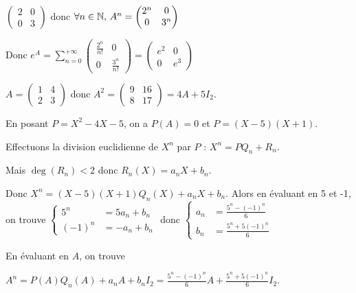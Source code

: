 \begin{exemple}
    $\begin{pmatrix}
        2 & 0 \\
        0 & 3
    \end{pmatrix}$ donc $\forall n \in \mathbb{N}, \, A^n = \begin{pmatrix}
        2^n & 0 \\
        0 & 3^n
    \end{pmatrix}$

    Donc $\displaystyle e^A = \sum_{n = 0}^{+\infty} \begin{pmatrix}
        \frac{2^n}{n!} & 0 \\
        0 & \frac{3^n}{n!}
    \end{pmatrix} = \begin{pmatrix}
        e^2 & 0 \\
        0 & e^3
    \end{pmatrix}$

    \lvspace $A = \begin{pmatrix}
        1 & 4 \\
        2 & 3
    \end{pmatrix}$ donc $A^2 = \begin{pmatrix}
        9 & 16 \\
        8 & 17
    \end{pmatrix} = 4A + 5 I_2$. 

    En posant $P = X^2 - 4X - 5$, on a $P(A) = 0$ et $P = (X - 5)(X + 1)$.

    Effectuons la division euclidienne de $X^n$ par $P$ : $X^n = P Q_n + R_n$. 
    
    Mais $\deg(R_n) < 2$ donc $R_n(X) = a_n X + b_n$. 

    Donc $X^n = (X - 5)(X + 1) Q_n(X) + a_n X + b_n$. Alors en évaluant en 5 et -1, on trouve
    $\left\{ \begin{array}{rl}
        5^n & = 5 a_n + b_n \\
        (-1)^n & = -a_n + b_n
    \end{array} \right.$ donc $\left\{ \begin{array}{rl}
        a_n & = \frac{5^n - (-1)^n}{6} \\
        b_n & = \frac{5^{n} + 5(-1)^n}{6}
    \end{array} \right.$

    En évaluant en $A$, on trouve 
    
    $A^n = P(A) Q_n(A) + a_n A + b_n I_2 = \frac{5^n - (-1)^n}{6} A + \frac{5^n + 5(-1)^n}{6} I_2$.


\end{exemple}
